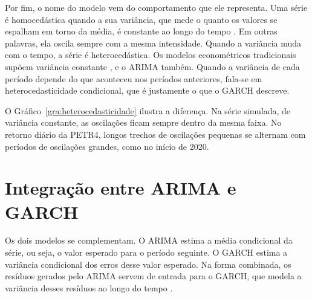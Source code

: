 Por fim, o nome do modelo vem do comportamento que ele representa. Uma série é
homocedástica quando a sua variância, que mede o quanto os valores se espalham em
torno da média, é constante ao longo do tempo \cite[p.~47]{thomaz2019}. Em outras
palavras, ela oscila sempre com a mesma intensidade. Quando a variância muda com
o tempo, a série é heterocedástica. Os modelos econométricos tradicionais supõem
variância constante \cite[p.~987]{engle1982}, e o ARIMA também. Quando a variância
de cada período depende do que aconteceu nos períodos anteriores, fala-se em
heterocedasticidade condicional, que é justamente o que o GARCH descreve.

O Gráfico~\ref{gra:heterocedasticidade} ilustra a diferença. Na série simulada,
de variância constante, as oscilações ficam sempre dentro da mesma faixa. No
retorno diário da PETR4, longos trechos de oscilações pequenas se alternam com
períodos de oscilações grandes, como no início de 2020.


\section{Integração entre ARIMA e GARCH}
\label{sec:integracao}

Os dois modelos se complementam. O ARIMA estima a média condicional da série, ou
seja, o valor esperado para o período seguinte. O GARCH estima a variância
condicional dos erros desse valor esperado. Na forma combinada, os resíduos
gerados pelo ARIMA servem de entrada para o GARCH, que modela a variância desses
resíduos ao longo do tempo \cite{araya2024}.

